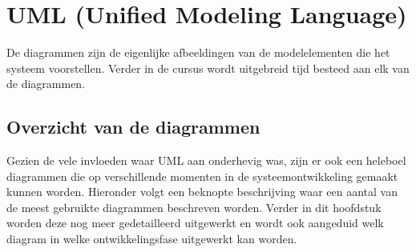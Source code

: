 \section{UML (Unified Modeling Language)}

De diagrammen zijn de eigenlijke afbeeldingen van de modelelementen die het systeem voorstellen. Verder in de cursus wordt uitgebreid tijd besteed aan elk van de diagrammen.

\subsection{Overzicht van de diagrammen}

Gezien de vele invloeden waar UML aan onderhevig was, zijn er ook een heleboel diagrammen die op verschillende momenten in de systeemontwikkeling gemaakt kunnen worden. Hieronder volgt een beknopte beschrijving waar een aantal van de meest gebruikte diagrammen beschreven worden. Verder in dit hoofdstuk worden deze nog meer gedetailleerd uitgewerkt en wordt ook aangeduid welk diagram in welke ontwikkelingsfase uitgewerkt kan worden.

